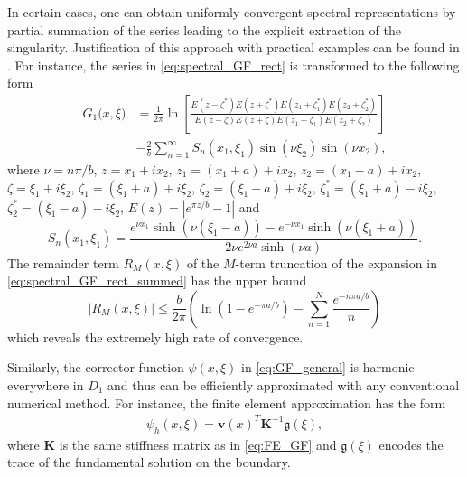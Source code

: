 In certain cases, one can obtain uniformly convergent spectral representations by partial summation of the series leading to the explicit extraction of the singularity.
Justification of this approach with practical examples can be found in \cite{Melnikov1998}.
For instance, the series in \eqref{eq:spectral_GF_rect} is transformed to the following form
\begin{align} \label{eq:spectral_GF_rect_summed}
	G_1 \big( x, \xi \big) 
	&= 
	\frac{1}{2\pi} \ln \left[ \frac{E(z-\zeta^{*})E(z+\zeta^{*})E(z_1+\zeta_1^{*})E(z_2+\zeta_2^{*})}{E(z-\zeta)E(z+\zeta)E(z_1+\zeta_1)E(z_2+\zeta_2)} \right]
	\\ \nonumber
	&-
	\frac{2}{b} \sum_{n=1}^{\infty} S_n(x_1,\xi_1) \sin\left(\nu\xi_2\right) \sin\left(\nu x_2\right),
\end{align}
where $\nu = n\pi / b$, $z=x_1+ix_2$, $z_1=(x_1+a)+i x_2$, $z_2=(x_1-a)+i x_2$, $\zeta=\xi_1+i \xi_2$, $\zeta_1=(\xi_1+a)+i \xi_2$, $\zeta_2=(\xi_1-a)+i \xi_2$, $\zeta_1^{*}=(\xi_1+a)-i \xi_2$, $\zeta_2^{*}=(\xi_1-a)-i \xi_2$, $E(z)=\left|e^{\pi z/b}-1\right|$ and
$$
S_n(x_1,\xi_1) = \frac{e^{\nu x_1}\sinh(\nu(\xi_1-a))-e^{-\nu x_1}\sinh(\nu(\xi_1+a))}{2\nu e^{2\nu a}\sinh(\nu a)}.
$$
The remainder term $R_M(x,\xi)$ of the $M$-term truncation of the expansion in \eqref{eq:spectral_GF_rect_summed} has the upper bound 
$$
|R_M(x,\xi)| \leq \frac{b}{2\pi} \left( \ln\left(1-e^{-\pi a/b}\right) - \sum_{n=1}^N \frac{e^{-n\pi a/b}}{n}  \right)
$$
which reveals the extremely high rate of convergence.


Similarly, the corrector function $\psi(x,\xi)$  in \eqref{eq:GF_general} is harmonic everywhere in $D_1$ and thus can be efficiently approximated with any conventional numerical method.
For instance, the finite element approximation has the form
\begin{align}\label{eq:GF_FE_reg_part}
	\psi_h(x,\xi) = \mathbf{v}(x)^T \mathbf K^{-1} \boldsymbol{\mathfrak{g}}(\xi),
\end{align}
where $\mathbf K$ is the same stiffness matrix as in \eqref{eq:FE_GF} and $\boldsymbol{\mathfrak{g}}(\xi)$ encodes the  trace of the fundamental solution on the boundary.

